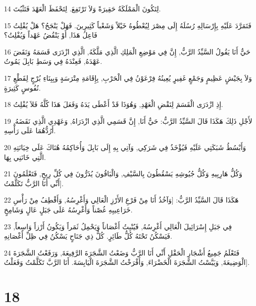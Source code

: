 \par 14 لِتَكُونَ الْمَمْلَكَةُ حَقِيرَةً وَلاَ تَرْتَفِعَ. لِتَحْفَظَ الْعَهْدَ فَتَثْبُتَ.
\par 15 فَتَمَرَّدَ عَلَيْهِ بِإِرْسَالِهِ رُسُلَهُ إِلَى مِصْرَ لِيُعْطُوهُ خَيْلاً وَشَعْباً كَثِيرِينَ. فَهَلْ يَنْجَحُ؟ هَلْ يُفْلِتُ فَاعِلُ هَذَا, أَوْ يَنْقُضُ عَهْداً وَيُفْلِتُ؟
\par 16 حَيٌّ أَنَا يَقُولُ السَّيِّدُ الرَّبُّ, إِنَّ فِي مَوْضِعِ الْمَلِكِ الَّذِي مَلَّكَهُ, الَّذِي ازْدَرَى قَسَمَهُ وَنَقَضَ عَهْدَهُ, فَعِنْدَهُ فِي وَسَطِ بَابِلَ يَمُوتُ.
\par 17 وَلاَ بِجَيْشٍ عَظِيمٍ وَجَمْعٍ غَفِيرٍ يُعِينُهُ فِرْعَوْنُ فِي الْحَرْبِ, بِإِقَامَةِ مِتْرَسَةٍ وَبِبِنَاءِ بُرْجٍ لِقَطْعِ نُفُوسٍ كَثِيرَةٍ.
\par 18 إِذِ ازْدَرَى الْقَسَمَ لِنَقْضِ الْعَهْدِ, وَهُوَذَا قَدْ أَعْطَى يَدَهُ وَفَعَلَ هَذَا كُلَّهُ فَلاَ يُفْلِتُ.
\par 19 لأَجْلِ ذَلِكَ هَكَذَا قَالَ السَّيِّدُ الرَّبُّ: حَيٌّ أَنَا, إِنَّ قَسَمِي الَّذِي ازْدَرَاهُ, وَعَهْدِي الَّذِي نَقَضَهُ, أَرُدُّهُمَا عَلَى رَأْسِهِ.
\par 20 وَأَبْسُطُ شَبَكَتِي عَلَيْهِ فَيُؤْخَذُ فِي شَرَكِي, وَآتِي بِهِ إِلَى بَابِلَ وَأُحَاكِمُهُ هُنَاكَ عَلَى خِيَانَتِهِ الَّتِي خَانَنِي بِهَا.
\par 21 وَكُلُّ هَارِبِيهِ وَكُلُّ جُيُوشِهِ يَسْقُطُونَ بِالسَّيْفِ, وَالْبَاقُونَ يُذَرُّونَ فِي كُلِّ رِيحٍ, فَتَعْلَمُونَ أَنِّي أَنَا الرَّبُّ تَكَلَّمْتُ].
\par 22 هَكَذَا قَالَ السَّيِّدُ الرَّبُّ: [وَآخُذُ أَنَا مِنْ فَرْعِ الأَرْزِ الْعَالِي وَأَغْرِسُهُ, وَأَقْطِفُ مِنْ رَأْسِ خَرَاعِيبِهِ غُصْناً وَأَغْرِسُهُ عَلَى جَبَلٍ عَالٍ وَشَامِخٍ.
\par 23 فِي جَبَلِ إِسْرَائِيلَ الْعَالِي أَغْرِسُهُ, فَيُنْبِتُ أَغْصَاناً وَيَحْمِلُ ثَمَراً وَيَكُونُ أَرْزاً وَاسِعاً, فَيَسْكُنُ تَحْتَهُ كُلُّ طَائِرٍ. كُلُّ ذِي جَنَاحٍ يَسْكُنُ فِي ظِلِّ أَغْصَانِهِ.
\par 24 فَتَعْلَمُ جَمِيعُ أَشْجَارِ الْحَقْلِ أَنِّي أَنَا الرَّبُّ وَضَعْتُ الشَّجَرَةَ الرَّفِيعَةَ, وَرَفَعْتُ الشَّجَرَةَ الْوَضِيعَةَ, وَيَبَّسْتُ الشَّجَرَةَ الْخَضْرَاءَ, وَأَفْرَخْتُ الشَّجَرَةَ الْيَابِسَةَ. أَنَا الرَّبَّ تَكَلَّمْتُ وَفَعَلْتُ].

\chapter{18}

